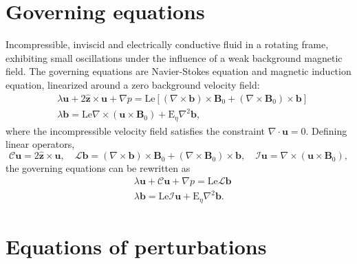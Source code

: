 \section{Governing equations}

Incompressible, inviscid and electrically conductive fluid in a rotating frame, exhibiting small oscillations under the influence of a weak background magnetic field. The governing equations are Navier-Stokes equation and magnetic induction equation, linearized around a zero background velocity field:
%
\begin{equation}
\begin{aligned}
    &\lambda \mathbf{u} + 2 \hat{\mathbf{z}} \times \mathbf{u} + \nabla p = \mathrm{Le} \left[(\nabla\times \mathbf{b}) \times \mathbf{B}_0 + (\nabla\times \mathbf{B}_0) \times \mathbf{b} \right] \\ 
    &\lambda \mathbf{b} = \mathrm{Le} \nabla\times (\mathbf{u}\times \mathbf{B}_0) + \mathrm{E}_\eta \nabla^2 \mathbf{b},
\end{aligned}
\end{equation}
%
where the incompressible velocity field satisfies the constraint $\nabla\cdot \mathbf{u} = 0$. Defining linear operators,
\begin{equation}
    \mathcal{C} \mathbf{u} = 2 \hat{\mathbf{z}} \times \mathbf{u}, \quad 
    \mathcal{L} \mathbf{b} = (\nabla\times \mathbf{b}) \times \mathbf{B}_0 + (\nabla\times \mathbf{B}_0) \times \mathbf{b}, \quad 
    \mathcal{I} \mathbf{u} = \nabla\times (\mathbf{u}\times \mathbf{B}_0),
\end{equation}
the governing equations can be rewritten as
%
\begin{equation}
    \begin{aligned}
        &\lambda \mathbf{u} + \mathcal{C} \mathbf{u} + \nabla p = \mathrm{Le} \mathcal{L}\mathbf{b} \\ 
        &\lambda \mathbf{b} = \mathrm{Le} \mathcal{I} \mathbf{u} + \mathrm{E}_\eta \nabla^2 \mathbf{b}.
    \end{aligned}
\end{equation}
%

\section{Equations of perturbations}

